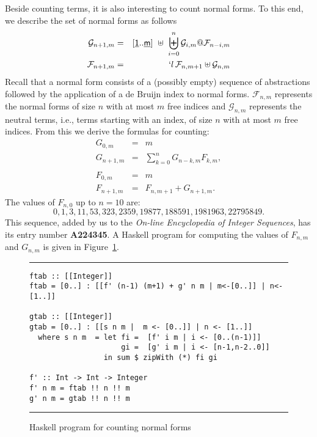 \documentclass{jfp1}
\newcommand{\F}{\mathcal{F}}
\newcommand{\G}{\mathcal{G}}
\newcommand{\Var}[1]{\underline{\mathsf{#1}}}
\begin{document}
Beside counting terms, it is also interesting to count normal forms.  To this end, we
describe the set of normal forms as follows
\begin{eqnarray*}
  \G_{n+1,m} &=&  [\Var{1} .. \Var{m}] \ \uplus\ \biguplus_{i=0}^n \G_{i,m} @ \F_{n-i,m}\\
  \F_{n+1,m} &=& `l\,\F_{n,m+1} \uplus \G_{n,m}
\end{eqnarray*}
Recall that a normal form consists of a (possibly empty) sequence of abstractions
followed by the application of a de Bruijn index to normal forms.  $\F_{n,m}$
represents the normal forms of size $n$ with at most $m$ free indices and $\G_{n,m}$
represents the neutral terms, i.e., terms starting with an index, of size $n$ with at
most $m$ free indices.  From this we derive the formulas for counting:
\begin{eqnarray*}
  G_{0,m} &=& m\\
  G_{n+1,m} &=& \sum_{k=0}^{n}G_{n-k,m} F_{k,m},\\\\
  F_{0,m} &=& m\\
  F_{n+1,m}&=& F_{n,m+1} + G_{n+1,m}.
\end{eqnarray*}
The values of $F_{n,0}$ up to $n=10$ are:
\[0, 1, 3, 11, 53, 323, 2359, 19877, 188591, 1981963, 22795849.\] This sequence, added by us to the \emph{On-line Encyclopedia of Integer Sequences}, has its entry number \textbf{A224345}.  A
\textsf{Haskell} program for computing the values of $F_{n,m}$ and
$G_{n,m}$ is given in Figure~\ref{fig:nf-program}.
\begin{figure}[!htb]
  \centering
\hrule

\medskip

\begin{verbatim}
ftab :: [[Integer]]
ftab = [0..] : [[f' (n-1) (m+1) + g' n m | m<-[0..]] | n<-[1..]]

gtab :: [[Integer]]
gtab = [0..] : [[s n m |  m <- [0..]] | n <- [1..]]
  where s n m  = let fi =  [f' i m | i <- [0..(n-1)]]
                     gi =  [g' i m | i <- [n-1,n-2..0]]
                 in sum $ zipWith (*) fi gi
 
f' :: Int -> Int -> Integer
f' n m = ftab !! n !! m
g' n m = gtab !! n !! m
\end{verbatim}
 \hrule
  \caption{\textsf{Haskell} program for counting normal forms}
\label{fig:nf-program}
\end{figure}
\end{document}
